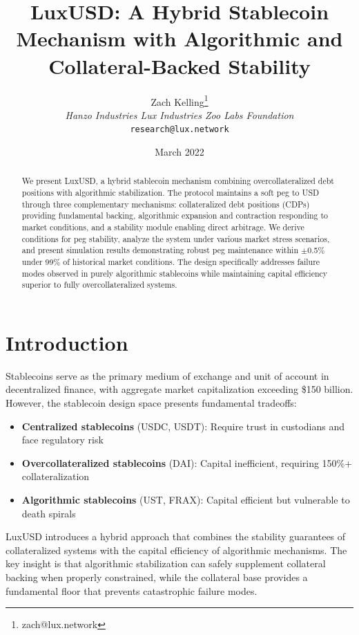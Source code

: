 \documentclass[11pt,a4paper]{article}
\title{LuxUSD: A Hybrid Stablecoin Mechanism with Algorithmic and Collateral-Backed Stability}
\author{Zach Kelling\thanks{zach@lux.network} \\ \textit{Hanzo Industries \quad Lux Industries \quad Zoo Labs Foundation} \\ \texttt{research@lux.network}}
\date{March 2022}
\begin{document}
\maketitle

\begin{abstract}
We present LuxUSD, a hybrid stablecoin mechanism combining overcollateralized debt positions with algorithmic stabilization. The protocol maintains a soft peg to USD through three complementary mechanisms: collateralized debt positions (CDPs) providing fundamental backing, algorithmic expansion and contraction responding to market conditions, and a stability module enabling direct arbitrage. We derive conditions for peg stability, analyze the system under various market stress scenarios, and present simulation results demonstrating robust peg maintenance within $\pm$0.5\% under 99\% of historical market conditions. The design specifically addresses failure modes observed in purely algorithmic stablecoins while maintaining capital efficiency superior to fully overcollateralized systems.
\end{abstract}

\section{Introduction}

Stablecoins serve as the primary medium of exchange and unit of account in decentralized finance, with aggregate market capitalization exceeding \$150 billion. However, the stablecoin design space presents fundamental tradeoffs:

\begin{itemize}
    \item \textbf{Centralized stablecoins} (USDC, USDT): Require trust in custodians and face regulatory risk
    \item \textbf{Overcollateralized stablecoins} (DAI): Capital inefficient, requiring 150\%+ collateralization
    \item \textbf{Algorithmic stablecoins} (UST, FRAX): Capital efficient but vulnerable to death spirals
\end{itemize}

LuxUSD introduces a hybrid approach that combines the stability guarantees of collateralized systems with the capital efficiency of algorithmic mechanisms. The key insight is that algorithmic stabilization can safely supplement collateral backing when properly constrained, while the collateral base provides a fundamental floor that prevents catastrophic failure modes.
\end{document}
